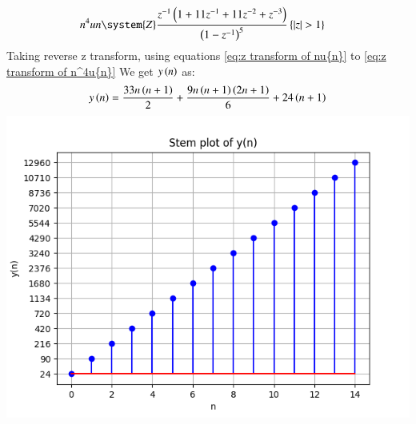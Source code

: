 \documentclass[journal,12pt,twocolumn]{IEEEtran}
\theoremstyle{remark}
\begin{document}
        \begin{align}
            n^4 u{n} &\system{Z} \frac{z^{-1}\brak{1+11z^{-1}+11z^{-2}+z^{-3}}}{\brak{1-z^{-1}}^5} \cbrak{\abs{z}>1}\label{eq:z transform of n^4u{n}}
        \end{align}
        Taking reverse z transform, using equations \eqref{eq:z transform of nu{n}} to \eqref{eq:z transform of n^4u{n}}
        We get $y\left(n\right)$ as: 
        \begin{align}
            y\left(n\right)=\frac{33n\left(n+1\right)}{2}+\frac{9n\left(n+1\right)\left(2n+1\right)}{6}+24\left(n+1\right)
        \end{align}
        \includegraphics[width=\columnwidth]{figs/plot.png}
        \label{fig:Graph1_math.11.9.4.8}
\renewcommand{\thefigure}{\theenumi}
\renewcommand{\thetable}{\theenumi}
\end{document}
